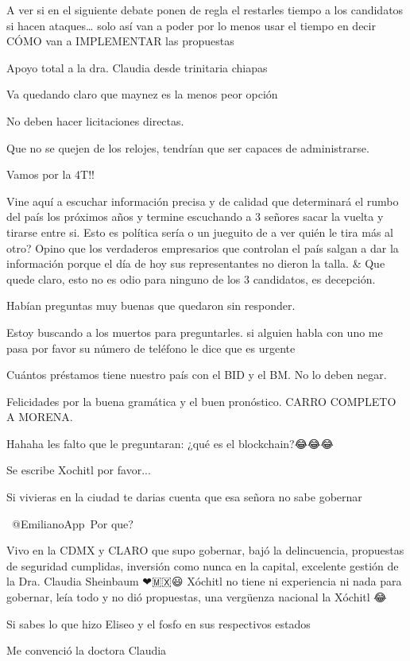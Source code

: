 A ver si en el siguiente debate ponen de regla el restarles tiempo a los candidatos si hacen ataques… solo así van a poder por lo menos usar el tiempo en decir CÓMO van a IMPLEMENTAR las propuestas

Apoyo total a la dra. Claudia desde trinitaria chiapas

Va quedando claro que maynez es la menos peor opción

No deben hacer licitaciones directas.

Que no se quejen de los relojes, tendrían que ser capaces de administrarse.

Vamos por la 4T!!

Vine aquí a escuchar información precisa y de calidad que determinará el rumbo del país los próximos años y termine escuchando a 3 señores sacar la vuelta y tirarse entre si.
Esto es política sería o un jueguito de a ver quién le tira más al otro?
Opino que los verdaderos empresarios que controlan el país salgan a dar la información porque el día de hoy sus representantes no dieron la talla.
& Que quede claro, esto no es odio para ninguno de los 3 candidatos, es decepción.

Habían preguntas muy buenas que quedaron sin responder.

Estoy buscando a los muertos para preguntarles. si alguien habla con uno me pasa por favor su número de teléfono le dice que es urgente  🤣🤣🤣🤣🤣🤣

Cuántos préstamos tiene nuestro país con el BID y el BM. No lo deben negar.

Felicidades por la buena gramática y el buen pronóstico.
CARRO COMPLETO A MORENA.

Hahaha les falto que le preguntaran: ¿qué es el blockchain?😂😂😂

Se escribe Xochitl por favor...

Si vivieras en la ciudad te darias cuenta que esa señora no sabe gobernar

​ @EmilianoApp Por que?

Vivo en la CDMX y CLARO que supo gobernar, bajó la delincuencia, propuestas de seguridad cumplidas, inversión como nunca en la capital, excelente gestión de la Dra. Claudia Sheinbaum ❤🇲🇽😃
Xóchitl no tiene ni experiencia ni nada para gobernar, leía todo y no dió propuestas, una vergüenza nacional la Xóchitl 😂

Si sabes lo que hizo Eliseo y el fosfo  en sus respectivos estados

Me convenció la doctora Claudia

